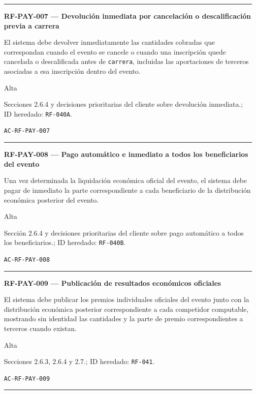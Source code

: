 \documentclass[10pt,letterpaper]{article}
\begin{document}
\vspace{0.25em}\hrule\vspace{0.65em}
\noindent\textbf{RF-PAY-007 --- Devolución inmediata por cancelación o descalificación previa a carrera}\par
\begin{description}[style=nextline,leftmargin=3.15cm,labelwidth=2.8cm,font=\normalfont\bfseries]
\item[Obligación] El sistema debe devolver inmediatamente las cantidades cobradas que correspondan cuando el evento se cancele o cuando una inscripción quede cancelada o descalificada antes de \texttt{carrera}, incluidas las aportaciones de terceros asociadas a esa inscripción dentro del evento.
\item[Prioridad] Alta
\item[Procedencia] Secciones 2.6.4 y decisiones prioritarias del cliente sobre devolución inmediata.; ID heredado: \texttt{RF-040A}.
\item[Verificación] \texttt{AC-RF-PAY-007}
\end{description}
\vspace{0.25em}\hrule\vspace{0.65em}
\noindent\textbf{RF-PAY-008 --- Pago automático e inmediato a todos los beneficiarios del evento}\par
\begin{description}[style=nextline,leftmargin=3.15cm,labelwidth=2.8cm,font=\normalfont\bfseries]
\item[Obligación] Una vez determinada la liquidación económica oficial del evento, el sistema debe pagar de inmediato la parte correspondiente a cada beneficiario de la distribución económica posterior del evento.
\item[Prioridad] Alta
\item[Procedencia] Sección 2.6.4 y decisiones prioritarias del cliente sobre pago automático a todos los beneficiarios.; ID heredado: \texttt{RF-040B}.
\item[Verificación] \texttt{AC-RF-PAY-008}
\end{description}
\vspace{0.25em}\hrule\vspace{0.65em}
\noindent\textbf{RF-PAY-009 --- Publicación de resultados económicos oficiales}\par
\begin{description}[style=nextline,leftmargin=3.15cm,labelwidth=2.8cm,font=\normalfont\bfseries]
\item[Obligación] El sistema debe publicar los premios individuales oficiales del evento junto con la distribución económica posterior correspondiente a cada competidor computable, mostrando sin identidad las cantidades y la parte de premio correspondientes a terceros cuando existan.
\item[Prioridad] Alta
\item[Procedencia] Secciones 2.6.3, 2.6.4 y 2.7.; ID heredado: \texttt{RF-041}.
\item[Verificación] \texttt{AC-RF-PAY-009}
\end{description}
\vspace{0.25em}\hrule\vspace{0.65em}
\end{document}
